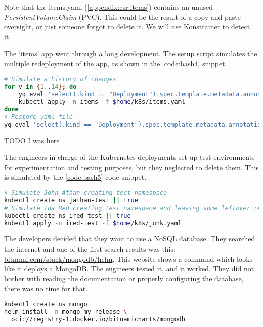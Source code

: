 Note that the items.yaml (\ref{appendix:csr:items}) contains an unused \emph{PersistentVolumeClaim} (PVC). This could be the result of a copy and paste oversight, or just someone forgot to delete it. We will use Konstrainer to detect it.

The `items' app went through a long development. The setup script simulates the multiple redeployment of the app, as shown in the \ref{code:bash4} snippet.

\begin{lstlisting}[caption={Create first deployment},language=bash,label=code:bash4]
# Simulate a history of changes
for v in {1..14}; do
    yq eval 'select(.kind == "Deployment").spec.template.metadata.annotations.v = env(v)' $home/k8s/items.yaml -i
    kubectl apply -n items -f $home/k8s/items.yaml
done
# Restore yaml file
yq eval 'select(.kind == "Deployment").spec.template.metadata.annotations.v = "0"' $home/k8s/items.yaml -i
\end{lstlisting}

TODO I was here

The engineers in charge of the Kubernetes deployments set up test environments for experimentation and testing purposes, but they neglected to delete them. This is simulated by the \ref{code:bash5} code snippet.

\begin{lstlisting}[caption={Create first deployment},language=bash,label=code:bash5]
# Simulate John Athan creating test namespace
kubectl create ns jathan-test || true
# Simulate Ida Red creating test namespace and leaving some leftover resources in it
kubectl create ns ired-test || true
kubectl apply -n ired-test -f $home/k8s/junk.yaml
\end{lstlisting}

The developers decided that they want to use a NoSQL database. They searched the internet and one of the first search results was this: \url{bitnami.com/stack/mongodb/helm}. This website shows a command which looks like it deploys a MongoDB. The engineers tested it, and it worked. They did not bother with reading the documentation or properly configuring the database, there was no time for that.

\begin{lstlisting}[caption={Create first deployment},language=bash,label=code:bash5]
kubectl create ns mongo
helm install -n mongo my-release \
  oci://registry-1.docker.io/bitnamicharts/mongodb
\end{lstlisting}


